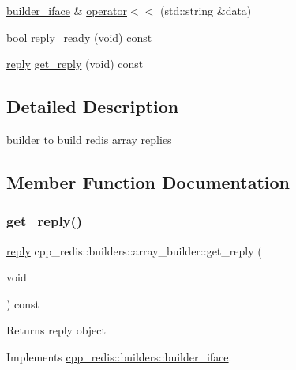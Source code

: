 \begin{DoxyCompactItemize}
\hyperlink{classcpp__redis_1_1builders_1_1builder__iface}{builder\+\_\+iface} \& \hyperlink{classcpp__redis_1_1builders_1_1array__builder_a043357d0ef70406adef4df78c8d5307f}{operator$<$$<$} (std\+::string \&data)
\item 
bool \hyperlink{classcpp__redis_1_1builders_1_1array__builder_a524f2cb943dde1246dea1b7057e6351e}{reply\+\_\+ready} (void) const
\item 
\hyperlink{classcpp__redis_1_1reply}{reply} \hyperlink{classcpp__redis_1_1builders_1_1array__builder_ac5c805ad87b357a9578c5a0d479109b3}{get\+\_\+reply} (void) const
\end{DoxyCompactItemize}


\subsection{Detailed Description}
builder to build redis array replies 

\subsection{Member Function Documentation}
\mbox{\label{classcpp__redis_1_1builders_1_1array__builder_ac5c805ad87b357a9578c5a0d479109b3}} 
\subsubsection{\texorpdfstring{get\+\_\+reply()}{get\_reply()}}
{\footnotesize\ttfamily \hyperlink{classcpp__redis_1_1reply}{reply} cpp\+\_\+redis\+::builders\+::array\+\_\+builder\+::get\+\_\+reply (\begin{DoxyParamCaption}\item[{void}]{ }\end{DoxyParamCaption}) const\hspace{0.3cm}{\ttfamily [virtual]}}

\begin{DoxyReturn}{Returns}
reply object 
\end{DoxyReturn}


Implements \hyperlink{classcpp__redis_1_1builders_1_1builder__iface_afd2ff2c2371c2a486116543b638b9413}{cpp\+\_\+redis\+::builders\+::builder\+\_\+iface}.

